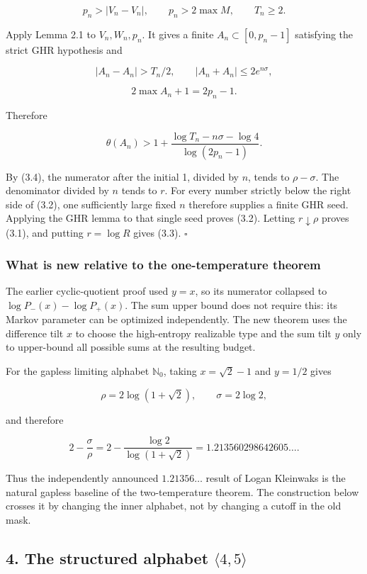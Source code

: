 \documentclass[
  10pt,
]{article}
\begin{document}
\[
p_n>|V_n-V_n|,\qquad p_n>2\max M,\qquad T_n\ge2.
\]

Apply Lemma 2.1 to \(V_n,W_n,p_n\). It gives a finite
\(A_n\subset[0,p_n-1]\) satisfying the strict GHR hypothesis and

\[
|A_n-A_n|>T_n/2,
\qquad
|A_n+A_n|\le2e^{n\sigma},
\]

\[
2\max A_n+1=2p_n-1.
\]

Therefore

\[
\theta(A_n)>
1+\frac{\log T_n-n\sigma-\log4}{\log(2p_n-1)}.
\]

By (3.4), the numerator after the initial 1, divided by \(n\), tends to
\(\rho-\sigma\). The denominator divided by \(n\) tends to \(r\). For
every number strictly below the right side of (3.2), one sufficiently
large fixed \(n\) therefore supplies a finite GHR seed. Applying the GHR
lemma to that single seed proves (3.2). Letting \(r\downarrow\rho\)
proves (3.1), and putting \(r=\log R\) gives (3.3). \(\square\)

\subsubsection{What is new relative to the one-temperature
theorem}\label{what-is-new-relative-to-the-one-temperature-theorem}

The earlier cyclic-quotient proof used \(y=x\), so its numerator
collapsed to \(\log P_-(x)-\log P_+(x)\). The sum upper bound does not
require this: its Markov parameter can be optimized independently. The
new theorem uses the difference tilt \(x\) to choose the high-entropy
realizable type and the sum tilt \(y\) only to upper-bound all possible
sums at the resulting budget.

For the gapless limiting alphabet \(\mathbb N_0\), taking \(x=\sqrt2-1\)
and \(y=1/2\) gives

\[
\rho=2\log(1+\sqrt2),
\qquad
\sigma=2\log2,
\]

and therefore

\[
2-\frac{\sigma}{\rho}
=2-\frac{\log2}{\log(1+\sqrt2)}
=1.213560298642605\ldots.
\]

Thus the independently announced \(1.21356\ldots\) result of Logan
Kleinwaks is the natural gapless baseline of the two-temperature
theorem. The construction below crosses it by changing the inner
alphabet, not by changing a cutoff in the old mask.

\subsection{\texorpdfstring{4. The structured alphabet
\(\langle4,5\rangle\)}{4. The structured alphabet \textbackslash langle4,5\textbackslash rangle}}\label{the-structured-alphabet-langle45rangle}
\end{document}
